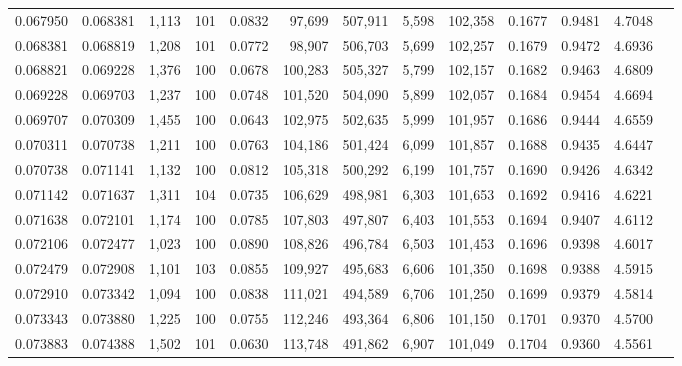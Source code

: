 \begin{tabular}{rrrrrrrrrrrrr}
0.067950 & 0.068381 & 1,113 & 101 &                                     0.0832 &  97,699 & 507,911 &   5,598 & 102,358 & 0.1677 & 0.9481 & 4.7048 \\
0.068381 & 0.068819 & 1,208 & 101 &                                     0.0772 &  98,907 & 506,703 &   5,699 & 102,257 & 0.1679 & 0.9472 & 4.6936 \\
0.068821 & 0.069228 & 1,376 & 100 &                                     0.0678 & 100,283 & 505,327 &   5,799 & 102,157 & 0.1682 & 0.9463 & 4.6809 \\
0.069228 & 0.069703 & 1,237 & 100 &                                     0.0748 & 101,520 & 504,090 &   5,899 & 102,057 & 0.1684 & 0.9454 & 4.6694 \\
0.069707 & 0.070309 & 1,455 & 100 &                                     0.0643 & 102,975 & 502,635 &   5,999 & 101,957 & 0.1686 & 0.9444 & 4.6559 \\
0.070311 & 0.070738 & 1,211 & 100 &                                     0.0763 & 104,186 & 501,424 &   6,099 & 101,857 & 0.1688 & 0.9435 & 4.6447 \\
0.070738 & 0.071141 & 1,132 & 100 &                                     0.0812 & 105,318 & 500,292 &   6,199 & 101,757 & 0.1690 & 0.9426 & 4.6342 \\
0.071142 & 0.071637 & 1,311 & 104 &                                     0.0735 & 106,629 & 498,981 &   6,303 & 101,653 & 0.1692 & 0.9416 & 4.6221 \\
0.071638 & 0.072101 & 1,174 & 100 &                                     0.0785 & 107,803 & 497,807 &   6,403 & 101,553 & 0.1694 & 0.9407 & 4.6112 \\
0.072106 & 0.072477 & 1,023 & 100 &                                     0.0890 & 108,826 & 496,784 &   6,503 & 101,453 & 0.1696 & 0.9398 & 4.6017 \\
0.072479 & 0.072908 & 1,101 & 103 &                                     0.0855 & 109,927 & 495,683 &   6,606 & 101,350 & 0.1698 & 0.9388 & 4.5915 \\
0.072910 & 0.073342 & 1,094 & 100 &                                     0.0838 & 111,021 & 494,589 &   6,706 & 101,250 & 0.1699 & 0.9379 & 4.5814 \\
0.073343 & 0.073880 & 1,225 & 100 &                                     0.0755 & 112,246 & 493,364 &   6,806 & 101,150 & 0.1701 & 0.9370 & 4.5700 \\
0.073883 & 0.074388 & 1,502 & 101 &                                     0.0630 & 113,748 & 491,862 &   6,907 & 101,049 & 0.1704 & 0.9360 & 4.5561 \\

\end{tabular}
